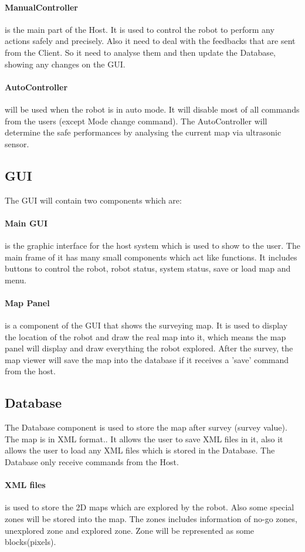 \documentclass[11pt, a4paper]{report}
\begin{document}
\paragraph{ManualController} is the main part of the Host. It is used to control the robot to perform 
any actions safely and precisely. Also it need to deal with the feedbacks that are sent from the Client.
So it need to analyse them and then update the Database, showing any changes on the GUI.
\paragraph{AutoController} will be used when the robot is in auto mode. 
It will disable most of all commands from the users (except Mode change command). 
The AutoController will determine the safe performances by analysing the current map 
via ultrasonic sensor.
\subsection{GUI} The GUI  will contain two components which are:
\paragraph{Main GUI} is the graphic interface for the host system which is used to show to the user.
 The main frame of it has many small components which act like functions.
 It includes buttons to control the robot, robot status, system status, save or load map and menu.
\paragraph{Map Panel} is a component of the GUI that shows the surveying map. 
It is used to display the location of the robot and draw the real map into it, 
which means the map panel will display and draw everything the robot explored. 
After the survey, the map viewer will save the map into the database if it receives a 'save' command 
from the host.
\subsection{Database} The Database component is used to store the map after survey (survey value).
 The map is in XML format.. It allows the user to save XML files in it, also it allows the user to load any XML files which is stored in the Database.
  The Database only receive commands from the Host.
\paragraph{XML files} is used to store the 2D maps which are explored by the robot. Also some special zones will be stored into the map. The zones includes information of no-go zones, unexplored zone and explored zone. Zone will be represented as some blocks(pixels).
\end{document}
